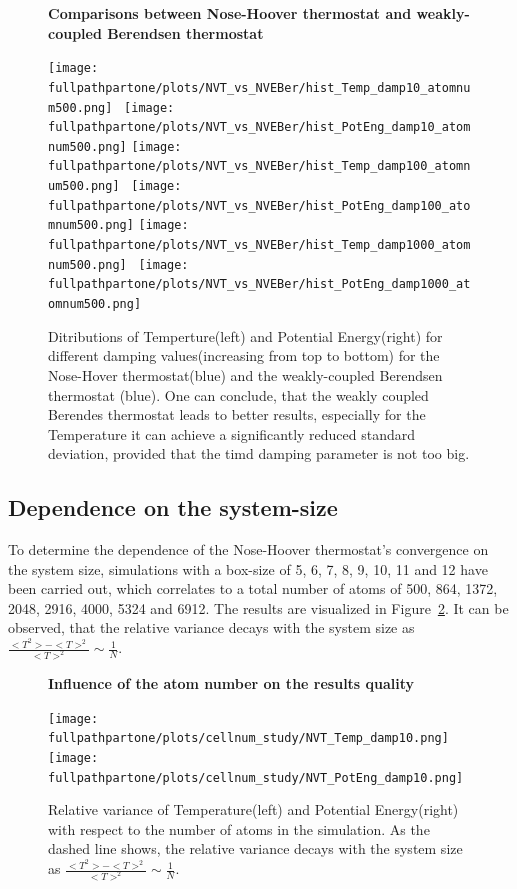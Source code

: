 \documentclass[10pt,a4paper]{report}
\def \fullpathpartone {/home/lukas/Desktop/project/independence/atomistic_modeling/exam/1_three-dimensional_atomic_system}
\newcommand*{\figuretitle}[1]{%
    {\centering%
    \textbf{#1}%
    \par\medskip}%
}
\begin{document}
\begin{center}
\begin{figure}[h]
\figuretitle{Comparisons between Nose-Hoover thermostat and weakly-coupled Berendsen thermostat}
\texttt{[image: \\fullpathpartone/plots/NVT\_vs\_NVEBer/hist\_Temp\_damp10\_atomnum500.png]}~
\texttt{[image: \\fullpathpartone/plots/NVT\_vs\_NVEBer/hist\_PotEng\_damp10\_atomnum500.png]}
\texttt{[image: \\fullpathpartone/plots/NVT\_vs\_NVEBer/hist\_Temp\_damp100\_atomnum500.png]}~
\texttt{[image: \\fullpathpartone/plots/NVT\_vs\_NVEBer/hist\_PotEng\_damp100\_atomnum500.png]}
\texttt{[image: \\fullpathpartone/plots/NVT\_vs\_NVEBer/hist\_Temp\_damp1000\_atomnum500.png]}~
\texttt{[image: \\fullpathpartone/plots/NVT\_vs\_NVEBer/hist\_PotEng\_damp1000\_atomnum500.png]}
\caption[Comparisons between Nose-Hoover thermostat and weakly-coupled Berendsen thermostat - histograms]{Ditributions of Temperture(left) and Potential Energy(right) for different damping values(increasing from top to bottom) for the Nose-Hover thermostat(blue) and the weakly-coupled Berendsen thermostat (blue). One can conclude, that the weakly coupled Berendes thermostat leads to better results, especially for the Temperature it can achieve a significantly reduced standard deviation, provided that the timd damping parameter is not too big.}
\label{fig:p1_NVT_vs_NVEBer_histograms}
\end{figure}
\end{center}


\subsection{Dependence on the system-size}
To determine the dependence of the Nose-Hoover thermostat's convergence on the system size, simulations with a box-size of 5, 6, 7, 8, 9, 10, 11 and 12 have been carried out, which correlates to a total number of atoms of 500, 864, 1372, 2048, 2916, 4000, 5324 and 6912. The results are visualized in Figure~\ref{fig:p1_cellnum_study}. It can be observed, that the relative variance decays with the system size as $\frac{<T^2>-<T>^2}{<T>^2}\sim\frac{1}{N}$.

\begin{center}
\begin{figure}[h]
\figuretitle{Influence of the atom number on the results quality}
\texttt{[image: \\fullpathpartone/plots/cellnum\_study/NVT\_Temp\_damp10.png]}
\texttt{[image: \\fullpathpartone/plots/cellnum\_study/NVT\_PotEng\_damp10.png]}
\caption[Influence of the atom number on the results quality]{Relative variance of Temperature(left) and Potential Energy(right) with respect to the number of atoms in the simulation. As the dashed line shows, the relative variance decays with the system size as $\frac{<T^2>-<T>^2}{<T>^2}\sim\frac{1}{N}$.}
\label{fig:p1_cellnum_study}
\end{figure}
\end{center}
\end{document}
